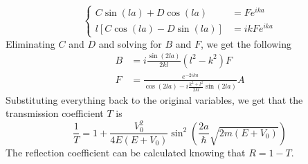 \documentclass[../qm.tex]{subfiles}
\begin{document}
	\begin{equation}
		\left\{ \begin{aligned}
				C\sin(la)+D\cos(la)&=Fe^{ika}\\
				l\left[ C\cos(la)-D\sin(la) \right]&=ikFe^{ika}
		\end{aligned}\right.
		\label{eq:conditionsfinitewelll}
	\end{equation}
	Eliminating $C$ and $D$ and solving for $B$ and $F$, we get the following
	\begin{equation}
		\begin{aligned}
			B&=i\frac{\sin(2la)}{2kl}\left( l^2-k^2 \right)F\\
			F&=\frac{e^{-2ika}}{\cos(2la)-i\frac{k^2+l^2}{2kl}\sin(2la)}A
		\end{aligned}
		\label{eq:bfinitewell}
	\end{equation}
	Substituting everything back to the original variables, we get that the transmission coefficient $T$ is
	\begin{equation}
		\frac{1}{T}=1+\frac{V_0^2}{4E(E+V_0)}\sin^2\left( \frac{2a}{\hbar}\sqrt{2m\left( E+V_0 \right)} \right)
		\label{eq:transmissioncoeff}
	\end{equation}
	The reflection coefficient can be calculated knowing that $R=1-T$.
\end{document}
